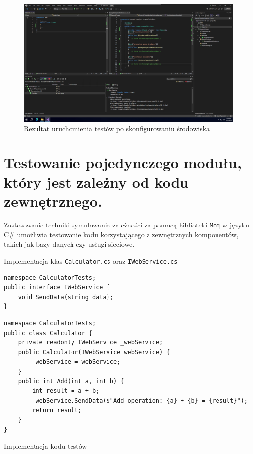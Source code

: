 \documentclass[12pt]{article}
\begin{document}
\begin{figure}[H]
  \centering
  \includegraphics[width=1\textwidth,keepaspectratio]{image-25.png}
  \caption{Rezultat uruchomienia testów po skonfigurowaniu środowiska}
  \label{fig:image-25}
\end{figure}

\pagebreak
\section{Testowanie pojedynczego modułu, który jest zależny od kodu zewnętrznego.}
\begin{description}
  \item {Zastosowanie techniki symulowania zależności za pomocą biblioteki \texttt{Moq} w języku C\# umożliwia testowanie kodu korzystającego z zewnętrznych komponentów, takich jak bazy danych czy usługi sieciowe.}
\end{description}
\vspace*{\fill}
Implementacja klas \texttt{Calculator.cs} oraz \texttt{IWebService.cs}
\begin{verbatim}
namespace CalculatorTests;
public interface IWebService {
    void SendData(string data);
}
\end{verbatim}

\begin{verbatim}
namespace CalculatorTests;
public class Calculator {
    private readonly IWebService _webService;
    public Calculator(IWebService webService) {
        _webService = webService;
    }
    public int Add(int a, int b) {
        int result = a + b;
        _webService.SendData($"Add operation: {a} + {b} = {result}");
        return result;
    }
}
\end{verbatim}
\vspace*{\fill}
\newpage
Implementacja kodu testów
\end{document}
